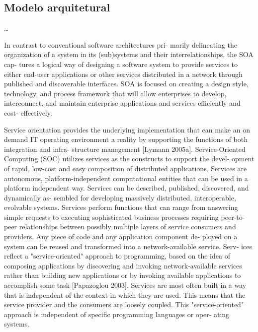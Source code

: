 \subsection{Modelo arquitetural}
\vspace{-6mm}
\ldots

In contrast to conventional software architectures pri-
marily delineating the organization of a system in its
(sub)systems and their interrelationships, the SOA cap-
tures a logical way of designing a software system to
provide services to either end-user applications or other
services distributed in a network through published and
discoverable interfaces. SOA is focused on creating a
design style, technology, and process framework that will
allow enterprises to develop, interconnect, and maintain
enterprise applications and services efficiently and cost-
effectively.
\cite{papazoglou2007serviceApprTechRechIss}



 Service orientation provides the underlying implementation that can make an on demand IT
operating environment a reality by supporting the functions of both integration and infra-
structure management [Lymann 2005a].
Service-Oriented Computing (SOC) utilizes services as the constructs to support the devel-
opment of rapid, low-cost and easy composition of distributed applications. Services are
autonomous, platform-independent computational entities that can be used in a platform
independent way. Services can be described, published, discovered, and dynamically as-
sembled for developing massively distributed, interoperable, evolvable systems. Services
perform functions that can range from answering simple requests to executing sophisticated
business processes requiring peer-to-peer relationships between possibly multiple layers of
service consumers and providers. Any piece of code and any application component de-
ployed on a system can be reused and transformed into a network-available service. Serv-
ices reflect a "service-oriented" approach to programming, based on the idea of composing
applications by discovering and invoking network-available services rather than building new
applications or by invoking available applications to accomplish some task [Papazoglou
2003]. Services are most often built in a way that is independent of the context in which
they are used. This means that the service provider and the consumers are loosely coupled.
This "service-oriented" approach is independent of specific programming languages or oper-
ating systems.



